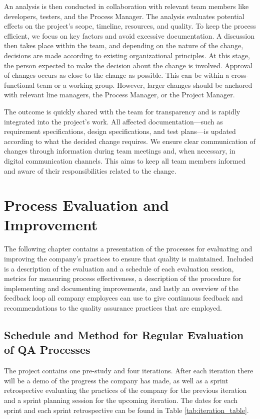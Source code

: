 \documentclass{article}
\begin{document}
An analysis is then conducted in collaboration with relevant team members like developers, testers, and the Process Manager. The analysis evaluates potential effects on the project’s scope, timeline, resources, and quality. To keep the process efficient, we focus on key factors and avoid excessive documentation. A discussion then takes place within the team, and depending on the nature of the change, decisions are made according to existing organizational principles. At this stage, the person expected to make the decision about the change is involved. Approval of changes occurs as close to the change as possible. This can be within a cross-functional team or a working group. However, larger changes should be anchored with relevant line managers, the Process Manager, or the Project Manager.

The outcome is quickly shared with the team for transparency and is rapidly integrated into the project’s work. All affected documentation—such as requirement specifications, design specifications, and test plans—is updated according to what the decided change requires. We ensure clear communication of changes through information during team meetings and, when necessary, in digital communication channels. This aims to keep all team members informed and aware of their responsibilities related to the change.

\newpage
\section{Process Evaluation and Improvement}
The following chapter contains a presentation of the processes for evaluating and improving the company's practices to ensure that quality is maintained. Included is a description of the evaluation and a schedule of each evaluation session, metrics for measuring process effectiveness, a description of the procedure for implementing and documenting improvements, and lastly an overview of the feedback loop all company employees can use to give continuous feedback and recommendations to the quality assurance practices that are employed. 

\subsection{Schedule and Method for Regular Evaluation of QA Processes}
\label{schedule_and_method_for_regular_evaluation_of_qa_processes}
The project contains one pre-study and four iterations. After each iteration there will be a demo of the progress the company has made, as well as a sprint retrospective evaluating the practices of the company for the previous iteration and a sprint planning session for the upcoming iteration. The dates for each sprint and each sprint retrospective can be found in Table \ref{tab:iteration_table}. 
\end{document}
